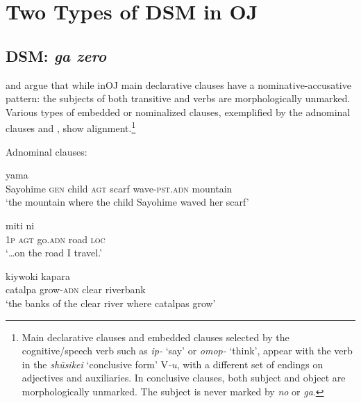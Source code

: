 \documentclass[output=paper]{LSP/langsci}
\begin{document}
\section{Two Types of DSM in OJ}\label{14-ya-sec:3}

\subsection{DSM: \textit{ga \vs zero}}
\label{14-sec:3.1}


\citet{Yanagida2007Jdaigo} and  \citet{Yanagidaetal2009Word} argue that while inOJ  main declarative clauses have a nominative-accusative pattern: the subjects of both transitive and  verbs are morphologically unmarked. Various types of embedded or nominalized clauses, exemplified by the adnominal clauses  and , show  alignment.\footnote{Main declarative clauses and embedded clauses selected by the cognitive/speech verb such as \textit{ip-} ‘say’ or \textit{omop-} ‘think’, appear with the verb in the \textit{sh\=usikei} ‘conclusive form’ V\textit{-u}, with a different set of endings on adjectives and auxiliaries. In conclusive clauses, both subject and object are morphologically unmarked. The subject is never marked by \textit{no} or \textit{ga}.} 

\begin{exe}
\ex Adnominal clauses: \label{14-ya-ex:6}
\begin{xlist}
\ex
\label{14-ya-ex:6a}
 yama\\ %
Sayohime \textsc{gen} child \textsc{agt} scarf {} wave-\textsc{pst}.\textsc{adn} mountain\\
\glt ‘the mountain where the child Sayohime waved her scarf’

\ex
\label{14-ya-ex:6b}
 miti ni\\ %
\textsc{1p} \textsc{agt} go.\textsc{adn} road \textsc{loc}\\
\glt ‘…on the road I travel.’

\ex
\label{14-ya-ex:6c}
 kiywoki kapara\\ %
catalpa {} grow-\textsc{adn} clear riverbank\\
\glt ‘the banks of the clear river where catalpas grow’
\end{xlist}
\end{exe}
\end{document}
